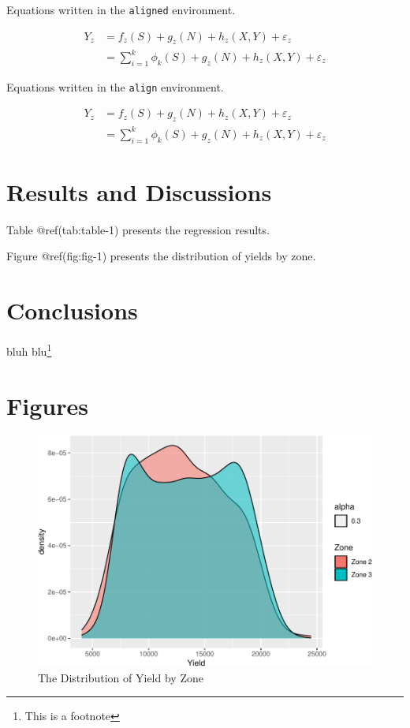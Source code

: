 \documentclass[
]{article}
\begin{document}
Equations written in the \texttt{aligned} environment.

\[
\begin{aligned}
 Y_z & = f_z(S) + g_z(N) + h_z(X,Y) + \varepsilon_z \\
& = \sum_{i=1}^k \phi_k(S) + g_z(N) + h_z(X,Y) + \varepsilon_z
\end{aligned}
\]

Equations written in the \texttt{align} environment.

\[
\begin{align}
 Y_z & = f_z(S) + g_z(N) + h_z(X,Y) + \varepsilon_z \\
& = \sum_{i=1}^k \phi_k(S) + g_z(N) + h_z(X,Y) + \varepsilon_z
\end{align}
\]

\hypertarget{results-and-discussions}{%
\section{Results and Discussions}\label{results-and-discussions}}

Table @ref(tab:table-1) presents the regression results.

Figure @ref(fig:fig-1) presents the distribution of yields by zone.

\hypertarget{conclusions}{%
\section{Conclusions}\label{conclusions}}

bluh blu\footnote{This is a footnote}

\hypertarget{figures}{%
\section{Figures}\label{figures}}

\begin{figure}

{\centering \includegraphics[width=468px]{sample_to_word_files/figure-latex/fig-1-1} 

}

\caption{The Distribution of Yield by Zone}\label{fig:fig-1}
\end{figure}
\end{document}
